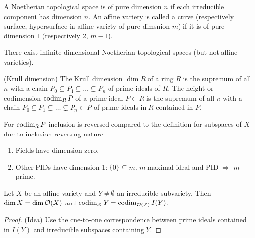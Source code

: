 \documentclass[a4paper,11pt]{article}
\begin{document}
			\begin{defi}
				A Noetherian topological space is of pure dimension $n$ if each irreducible component has dimension $n$. An affine variety is called a curve (respectively surface, hypersurface in affine variety of pure dimsnion $m$) if it is of pure dimension 1 (respectively 2, $m-1$).
			\end{defi}

			\begin{remark}
				There exist infinite-dimensional Noetherian topological spaces (but not affine varieties).
			\end{remark}

			\begin{defi}
				(Krull dimension) The Krull dimension $\dim R$ of a ring $R$ is the supremum of all $n$ with a chain $P_0\subsetneq P_1\subsetneq \dots\subsetneq P_n$ of prime ideals of $R$. The height or codimension $\operatorname{codim}_RP$ of a prime ideal $P\subset R$ is the supremum of all $n$ with a chain $P_0\subsetneq P_1\subsetneq\dots\subsetneq P_n\subset P$ of prime ideals in $R$ contained in $P$.
			\end{defi}

			\begin{remark}
				For $\operatorname{codim}_RP$ inclusion is reversed compared to the definition for subspaces of $X$ due to inclusion-reversing nature.
			\end{remark}

			\begin{eg}
				\begin{enumerate}
					\item Fields have dimension zero.
					\item Other PIDs have dimension 1: $\{0\}\subsetneq m$, $m$ maximal ideal and PID $\Longrightarrow$ $m$ prime.
				\end{enumerate}
			\end{eg}

			\begin{prop}
				Let $X$ be an affine variety and $Y\neq\emptyset$ an irreducible subvariety. Then $\dim X=\dim\mathcal{O}(X)$ and $\operatorname{codim}_XY=\operatorname{codim}_{\mathcal{O}(X)}I(Y)$.
			\end{prop}
			\begin{proof}\renewcommand{\qedsymbol}{}
				(Idea) Use the one-to-one correspondence between prime ideals contained in $I(Y)$ and irreducible subspaces containing $Y$.
			\end{proof}\renewcommand{\qedsymbol}{$\square$}
\end{document}
